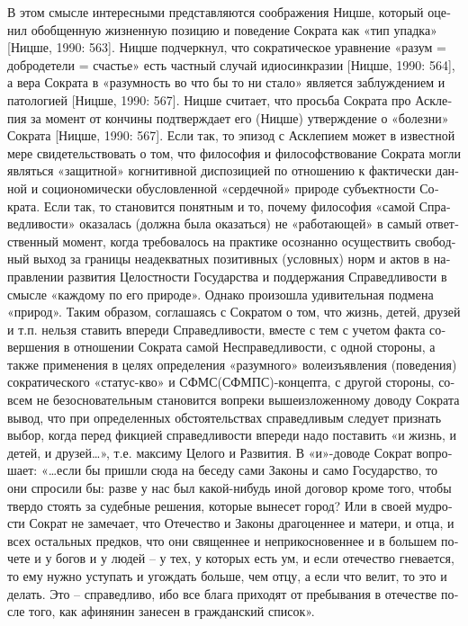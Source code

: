 \begin{russian}
    В этом смысле интересными представляются соображения Ницше, который оценил обобщенную жизненную позицию и поведение Сократа как «тип упадка» [Ницше, 1990: 563]. Ницше подчеркнул, что сократическое уравнение «разум = добродетели = счастье» есть частный случай идиосинкразии [Ницше, 1990: 564], а вера Сократа в «разумность во что бы то ни стало» является заблуждением и патологией [Ницше, 1990: 567]. Ницше считает, что просьба Сократа про Асклепия за момент от кончины подтверждает его (Ницше) утверждение о «болезни» Сократа [Ницше, 1990: 567]. Если так, то эпизод с Асклепием может в известной мере свидетельствовать о том, что философия и философствование Сократа могли являться «защитной» когнитивной диспозицией по отношению к фактически данной и социономически обусловленной «сердечной» природе субъектности Сократа. Если так, то становится понятным и то, почему философия «самой Справедливости» оказалась (должна была оказаться) не «работающей» в самый ответственный момент, когда требовалось  на практике осознанно осуществить свободный выход за границы неадекватных позитивных (условных) норм и актов в направлении развития Целостности Государства и поддержания Справедливости в смысле «каждому по его природе». Однако произошла удивительная подмена «природ».   
    Таким образом, соглашаясь с Сократом о том, что   жизнь, детей, друзей и т.п. нельзя ставить впереди Справедливости, вместе с тем с учетом факта совершения в отношении Сократа самой Несправедливости, с одной стороны, а также применения в целях определения «разумного» волеизъявления (поведения) сократического «статус-кво» и  СФМС(СФМПС)-концепта, с другой стороны, совсем не безосновательным становится вопреки вышеизложенному доводу Сократа вывод, что при определенных обстоятельствах  справедливым следует признать выбор, когда перед фикцией справедливости впереди надо поставить «и жизнь, и детей, и друзей…», т.е. максиму Целого и Развития.
    В «и»-доводе Сократ вопрошает: «…если бы пришли сюда на беседу сами Законы и само Государство, то они спросили бы: разве у нас был какой-нибудь иной договор кроме того, чтобы твердо стоять за судебные решения, которые вынесет город? Или в своей мудрости  Сократ не замечает, что Отечество и Законы драгоценнее и матери, и отца, и всех остальных предков, что они священнее и неприкосновеннее и в большем почете и у богов и у людей – у тех, у которых есть ум, и если отечество гневается, то ему нужно уступать и угождать больше, чем отцу, а если что велит, то это и  делать. Это – справедливо, ибо все блага приходят от пребывания в отечестве после того, как афинянин занесен в гражданский список».

\end{russian}
